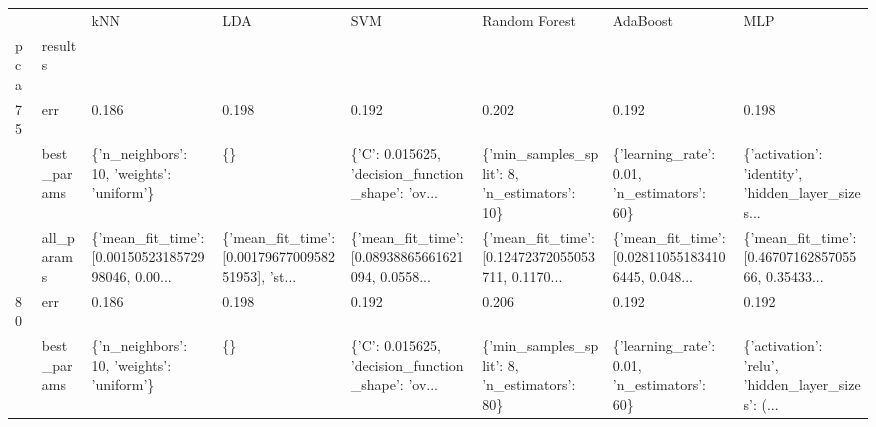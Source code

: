 \begin{tabular}{llllllll}
\toprule
    &            &                                                kNN &                                                LDA &                                                SVM &                                      Random Forest &                                           AdaBoost &                                                MLP \\
pca & results &                                                    &                                                    &                                                    &                                                    &                                                    &                                                    \\
\midrule
75  & err &                                              0.186 &                                              0.198 &                                              0.192 &                                              0.202 &                                              0.192 &                                              0.198 \\
    & best\_params &          \{'n\_neighbors': 10, 'weights': 'uniform'\} &                                                 \{\} &  \{'C': 0.015625, 'decision\_function\_shape': 'ov... &       \{'min\_samples\_split': 8, 'n\_estimators': 10\} &        \{'learning\_rate': 0.01, 'n\_estimators': 60\} &  \{'activation': 'identity', 'hidden\_layer\_sizes... \\
    & all\_params &  \{'mean\_fit\_time': [0.0015052318572998046, 0.00... &  \{'mean\_fit\_time': [0.0017967700958251953], 'st... &  \{'mean\_fit\_time': [0.08938865661621094, 0.0558... &  \{'mean\_fit\_time': [0.12472372055053711, 0.1170... &  \{'mean\_fit\_time': [0.028110551834106445, 0.048... &  \{'mean\_fit\_time': [0.4670716285705566, 0.35433... \\
80  & err &                                              0.186 &                                              0.198 &                                              0.192 &                                              0.206 &                                              0.192 &                                              0.192 \\
    & best\_params &          \{'n\_neighbors': 10, 'weights': 'uniform'\} &                                                 \{\} &  \{'C': 0.015625, 'decision\_function\_shape': 'ov... &       \{'min\_samples\_split': 8, 'n\_estimators': 80\} &        \{'learning\_rate': 0.01, 'n\_estimators': 60\} &  \{'activation': 'relu', 'hidden\_layer\_sizes': (... \\

\end{tabular}
